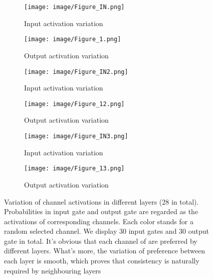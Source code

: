 \documentclass{article}
\begin{document}
\begin{figure*}[t!hb]
		
		
		\begin{subfigure}[t]{0.5\linewidth}
			\centering
			\captionsetup{justification=centering}
\texttt{[image: image/Figure\_IN.png]}
			\caption{Input activation variation	}
			\label{fig:side:a}
		\end{subfigure}\begin{subfigure}[t]{0.5\linewidth}
			\centering
			\captionsetup{justification=centering}
			\texttt{[image: image/Figure\_1.png]}
			\caption{Output activation variation
			}
			\label{fig:side:b}
			
					
		\end{subfigure}

			\begin{subfigure}[t]{0.5\linewidth}
		\centering
		\captionsetup{justification=centering}
\texttt{[image: image/Figure\_IN2.png]}
		\caption{Input activation variation	}
		\label{fig:side:a}
	\end{subfigure}\begin{subfigure}[t]{0.5\linewidth}
		\centering
		\captionsetup{justification=centering}
		\texttt{[image: image/Figure\_12.png]}
		\caption{Output activation variation
		}
		\label{fig:side:b}
		
		
	\end{subfigure}
	
			\begin{subfigure}[t]{0.5\linewidth}
		\centering
		\captionsetup{justification=centering}
\texttt{[image: image/Figure\_IN3.png]}
		\caption{Input activation variation	}
		\label{fig:side:a}
	\end{subfigure}\begin{subfigure}[t]{0.5\linewidth}
		\centering
		\captionsetup{justification=centering}
		\texttt{[image: image/Figure\_13.png]}
		\caption{Output activation variation
		}
		\label{fig:side:b}
		
		
	\end{subfigure}
		
		\caption{ Variation of channel activations in different layers (28 in total). Probabilities in  input gate  and output gate  are regarded as the activations of corresponding channels.  Each color stands for a random selected channel. We display 30 input gates and 30 output gate in total.	It's obvious that each channel of  are preferred by different layers. What's more, the variation of preference between each layer is smooth, which proves that consistency is naturally required by neighbouring layers
		}
	\end{figure*}
		
\end{document}
